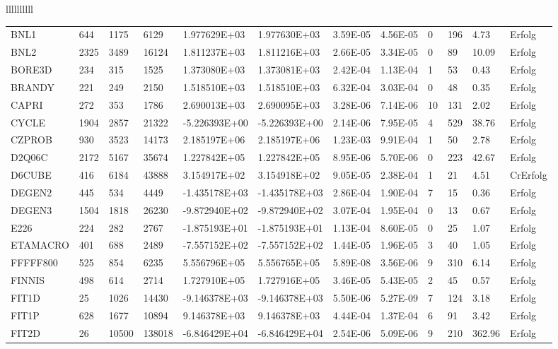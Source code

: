 \begin{tabular}{llllllllll}
\begin{tabular}{llllllllllll}
BNL1 & 644 & 1175 & 6129 & 1.977629E+03 & 1.977630E+03 & 3.59E-05 & 4.56E-05 & 0 & 196 & 4.73 & Erfolg \\
BNL2 & 2325 & 3489 & 16124 & 1.811237E+03 & 1.811216E+03 & 2.66E-05 & 3.34E-05 & 0 & 89 & 10.09 & Erfolg \\
BORE3D & 234 & 315 & 1525 & 1.373080E+03 & 1.373081E+03 & 2.42E-04 & 1.13E-04 & 1 & 53 & 0.43 & Erfolg \\
BRANDY & 221 & 249 & 2150 & 1.518510E+03 & 1.518510E+03 & 6.32E-04 & 3.03E-04 & 0 & 48 & 0.35 & Erfolg \\
CAPRI & 272 & 353 & 1786 & 2.690013E+03 & 2.690095E+03 & 3.28E-06 & 7.14E-06 & 10 & 131 & 2.02 & Erfolg \\
CYCLE & 1904 & 2857 & 21322 & -5.226393E+00 & -5.226393E+00 & 2.14E-06 & 7.95E-05 & 4 & 529 & 38.76 & Erfolg \\
CZPROB & 930 & 3523 & 14173 & 2.185197E+06 & 2.185197E+06 & 1.23E-03 & 9.91E-04 & 1 & 50 & 2.78 & Erfolg \\
D2Q06C & 2172 & 5167 & 35674 & 1.227842E+05 & 1.227842E+05 & 8.95E-06 & 5.70E-06 & 0 & 223 & 42.67 & Erfolg \\
D6CUBE & 416 & 6184 & 43888 & 3.154917E+02 & 3.154918E+02 & 9.05E-05 & 2.38E-04 & 1 & 21 & 4.51 & CrErfolg \\
DEGEN2 & 445 & 534 & 4449 & -1.435178E+03 & -1.435178E+03 & 2.86E-04 & 1.90E-04 & 7 & 15 & 0.36 & Erfolg \\
DEGEN3 & 1504 & 1818 & 26230 & -9.872940E+02 & -9.872940E+02 & 3.07E-04 & 1.95E-04 & 0 & 13 & 0.67 & Erfolg \\
E226 & 224 & 282 & 2767 & -1.875193E+01 & -1.875193E+01 & 1.13E-04 & 8.60E-05 & 0 & 25 & 1.07 & Erfolg \\
ETAMACRO & 401 & 688 & 2489 & -7.557152E+02 & -7.557152E+02 & 1.44E-05 & 1.96E-05 & 3 & 40 & 1.05 & Erfolg \\
FFFFF800 & 525 & 854 & 6235 & 5.556796E+05 & 5.556765E+05 & 5.89E-08 & 3.56E-06 & 9 & 310 & 6.14 & Erfolg \\
FINNIS & 498 & 614 & 2714 & 1.727910E+05 & 1.727916E+05 & 3.46E-05 & 5.43E-05 & 2 & 45 & 0.57 & Erfolg \\
FIT1D & 25 & 1026 & 14430 & -9.146378E+03 & -9.146378E+03 & 5.50E-06 & 5.27E-09 & 7 & 124 & 3.18 & Erfolg \\
FIT1P & 628 & 1677 & 10894 & 9.146378E+03 & 9.146378E+03 & 4.44E-04 & 1.37E-04 & 6 & 91 & 3.42 & Erfolg \\
FIT2D & 26 & 10500 & 138018 & -6.846429E+04 & -6.846429E+04 & 2.54E-06 & 5.09E-06 & 9 & 210 & 362.96 & Erfolg \\

\end{tabular}
\end{tabular}
